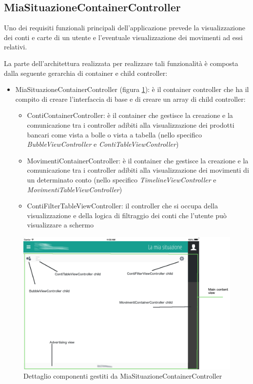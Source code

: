 \subsection{MiaSituazioneContainerController}
\label{parag:miasituaz}
Uno dei requisiti funzionali principali dell'applicazione prevede la visualizzazione dei conti e carte di un utente e l'eventuale visualizzazione dei movimenti ad essi relativi.

La parte dell'architettura realizzata per realizzare tali funzionalità è composta dalla seguente gerarchia di container e child controller:

\begin{itemize}
 \item MiaSituazioneContainerController (figura \ref{fig:miasituazione}): è il container controller che ha il compito di creare l'interfaccia di base e di creare un array di child controller:
 \begin{itemize}
  \item ContiContainerController: è il container che gestisce la creazione e la comunicazione tra i controller adibiti alla visualizzazione dei prodotti bancari come vista a bolle o vista a tabella (nello specifico \emph{BubbleViewController} e \emph{ContiTableViewController})
  \item MovimentiContainerController: è il container che gestisce la creazione e la comunicazione tra i controller adibiti alla visualizzazione dei movimenti di un determinato conto (nello specifico \emph{TimelineViewController} e \emph{MovimentiTableViewController})
  \item ContiFilterTableViewController: il controller che si occupa della visualizzazione e della logica di filtraggio dei conti che l'utente può visualizzare a schermo
 \end{itemize}
\end{itemize}
\begin{figure}[!htbp]
\centering
\includegraphics[scale=0.35]{dettagli/miasituazione.png}
\caption{Dettaglio componenti gestiti da MiaSituazioneContainerController}
\label{fig:miasituazione}
\end{figure}
